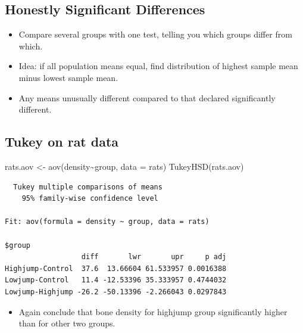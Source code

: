 \documentclass[
  letterpaper,
  DIV=11,
  numbers=noendperiod]{scrartcl}
\newenvironment{Shaded}{\begin{snugshade}}{\end{snugshade}}
\newcommand{\AttributeTok}[1]{\textcolor[rgb]{0.40,0.45,0.13}{#1}}
\newcommand{\FunctionTok}[1]{\textcolor[rgb]{0.28,0.35,0.67}{#1}}
\newcommand{\NormalTok}[1]{\textcolor[rgb]{0.00,0.23,0.31}{#1}}
\newcommand{\OtherTok}[1]{\textcolor[rgb]{0.00,0.23,0.31}{#1}}
\newcommand{\SpecialCharTok}[1]{\textcolor[rgb]{0.37,0.37,0.37}{#1}}
\providecommand{\tightlist}{%
  \setlength{\itemsep}{0pt}\setlength{\parskip}{0pt}}\usepackage{longtable,booktabs,array}
\begin{document}
\hypertarget{honestly-significant-differences}{%
\subsection{Honestly Significant
Differences}\label{honestly-significant-differences}}

\begin{itemize}
\tightlist
\item
  Compare several groups with one test, telling you which groups differ
  from which.
\item
  Idea: if all population means equal, find distribution of highest
  sample mean minus lowest sample mean.
\item
  Any means unusually different compared to that declared significantly
  different.
\end{itemize}

\hypertarget{tukey-on-rat-data}{%
\subsection{Tukey on rat data}\label{tukey-on-rat-data}}

\small

\begin{Shaded}
\begin{Highlighting}[]
\NormalTok{rats.aov }\OtherTok{\textless{}{-}} \FunctionTok{aov}\NormalTok{(density}\SpecialCharTok{\textasciitilde{}}\NormalTok{group, }\AttributeTok{data =}\NormalTok{ rats)}
\FunctionTok{TukeyHSD}\NormalTok{(rats.aov)}
\end{Highlighting}
\end{Shaded}

\begin{verbatim}
  Tukey multiple comparisons of means
    95% family-wise confidence level

Fit: aov(formula = density ~ group, data = rats)

$group
                  diff       lwr       upr     p adj
Highjump-Control  37.6  13.66604 61.533957 0.0016388
Lowjump-Control   11.4 -12.53396 35.333957 0.4744032
Lowjump-Highjump -26.2 -50.13396 -2.266043 0.0297843
\end{verbatim}

\normalsize

\begin{itemize}
\tightlist
\item
  Again conclude that bone density for highjump group significantly
  higher than for other two groups.
\end{itemize}
\end{document}
